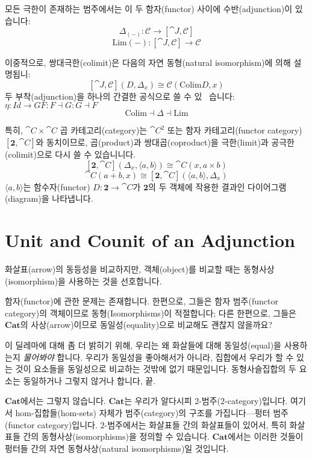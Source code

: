 \documentclass[DaoFP]{subfiles}
\begin{document}
모든 극한이 존재하는 범주에서는 이 두 함자(functor) 사이에 수반(adjunction)이 있습니다:
\[ \Delta_{(-)} \colon \mathcal{C} \to  [\cat J, \mathcal{C}] \]
\[ \text{Lim}{(-)} \colon  [\cat J, \mathcal{C}] \to \mathcal{C} \]

이중적으로, 쌍대극한(colimit)은 다음의 자연 동형(natural isomorphism)에 의해 설명됩니:
\[ [\cat J, \mathcal{C}](D, \Delta_x)  \cong \mathcal{C}( \text{Colim} D, x) \]
두 부착(adjunction)을 하나의 간결한 공식으로 쓸 수 있 ~습니다:$ \eta: Id \rightarrow GF : F \dashv G : G \dashv F $
\[ \text{Colim} \dashv \Delta \dashv \text{Lim}\]

특히, $\cat C \times \cat C$ 곱 카테고리(category)는 $\cat C^2$ 또는 함자 카테고리(functor category) $[\mathbf{2}, \cat C]$와 동치이므로, 곱(product)과 쌍대곱(coproduct)을 극한(limit)과 공극한(colimit)으로 다시 쓸 수 있습니니다.
\[ [\mathbf{2}, \cat C](\Delta_x, \langle a, b \rangle) \cong \cat C(x, a \times b) \]
\[ \cat C( a + b, x) \cong [\mathbf{2}, \cat C]( \langle a, b \rangle, \Delta_x) \]
$\langle a, b \rangle$는 함수자(functor) $D \colon \mathbf{2} \to \cat C$가 $\mathbf{2}$의 두 객체에 작용한 결과인 다이어그램(diagram)을 나타냅니다.

\section{Unit and Counit of an Adjunction}

화살표(arrow)의 동등성을 비교하지만, 객체(object)를 비교할 때는 동형사상(isomorphism)을 사용하는 것을 선호합니다.

함자(functor)에 관한 문제는 존재합니다. 한편으로, 그들은 함자 범주(functor category)의 객체이므로 동형(Isomorphisms)이 적절합니다; 다른 한편으로, 그들은 $\mathbf{Cat}$의 사상(arrow)이므로 동일성(equality)으로 비교해도 괜찮지 않을까요?

이 딜레마에 대해 좀 더 밝히기 위해, 우리는 왜 화살들에 대해 동일성(equal)을 사용하는지 \emph{물어봐야} 합니다. 우리가 동일성을 좋아해서가 아니라, 집합에서 우리가 할 수 있는 것이 요소들을 동일성으로 비교하는 것밖에 없기 때문입니다. 동형사슬집합의 두 요소는 동일하거나 그렇지 않거나 합니다, 끝.

$\mathbf{Cat}$에서는 그렇지 않습니다. $\mathbf{Cat}$는 우리가 알다시피 $2$-범주($2$-category)입니다. 여기서 hom-집합들(hom-sets) 자체가 범주(category)의 구조를 가집니다---펑터 범주(functor category)입니다. $2$-범주에서는 화살표들 간의 화살표들이 있어서, 특히 화살표들 간의 동형사상(isomorphisms)을 정의할 수 있습니다. $\mathbf{Cat}$에서는 이러한 것들이 펑터들 간의 자연 동형사상(natural isomorphisms)일 것입니다.
\end{document}
